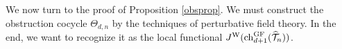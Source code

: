 \documentclass[10pt]{amsart}
\begin{document}
We now turn to the proof of Proposition \ref{obsprop}. 
We must construct the obstruction cocycle $\Theta_{d,n}$ by the techniques of perturbative field theory. 
In the end, we want to recognize it as the local functional $J^{\rm W}({\rm ch}^{{\rm GF}}_{d+1}(\widehat{\mathcal T}_n))$. 


%
%
%
\end{document}
